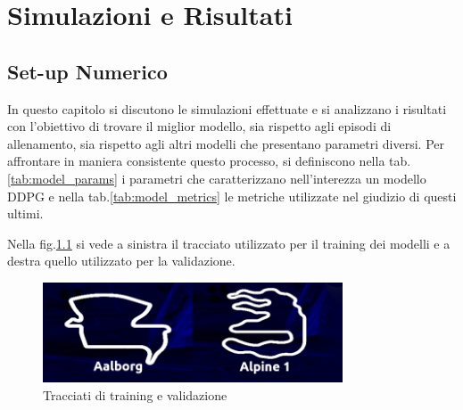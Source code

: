 \chapter{Simulazioni e Risultati}
\section{Set-up Numerico}
In questo capitolo si discutono le simulazioni effettuate e si analizzano i risultati con l'obiettivo di trovare il miglior modello, sia rispetto agli episodi di allenamento, sia rispetto agli altri modelli che presentano parametri diversi. Per affrontare in maniera consistente questo processo, si definiscono nella tab.\ref{tab:model_params} i parametri che caratterizzano nell'interezza un modello DDPG e nella tab.\ref{tab:model_metrics} le metriche utilizzate nel giudizio di questi ultimi.
\newline

Nella fig.\ref{fig:tracks} si vede a sinistra il tracciato utilizzato per il training dei modelli e a destra quello utilizzato per la validazione.

\begin{figure}[hb]
    \centering
    \includegraphics[width = 3.5in]{Figures/Chapter5/training_test_track.png}
    \caption{Tracciati di training e validazione}
    \label{fig:tracks}
\end{figure}

\clearpage


